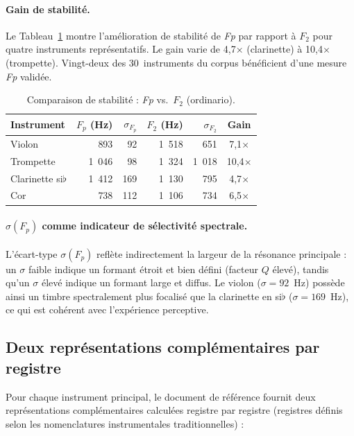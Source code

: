 \documentclass[12pt,a4paper]{article}
\begin{document}
\paragraph{Gain de stabilité.}
Le Tableau~\ref{tab:fp_stability} montre l'amélioration de stabilité de \textit{Fp}
par rapport à $F_2$ pour quatre instruments représentatifs. Le gain varie de
4,7$\times$ (clarinette) à 10,4$\times$ (trompette). Vingt-deux des 30~instruments
du corpus bénéficient d'une mesure \textit{Fp} validée.

\begin{table}[htbp]
\centering
\caption{Comparaison de stabilité : \textit{Fp} vs.\ $F_2$ (ordinario).}
\label{tab:fp_stability}
\begin{tabular}{lrrrrc}
\toprule
Instrument & $F_p$ (Hz) & $\sigma_{F_p}$ & $F_2$ (Hz) & $\sigma_{F_2}$ & Gain \\
\midrule
Violon          & 893   & 92  & 1~518 & 651   & 7,1$\times$ \\
Trompette       & 1~046 & 98  & 1~324 & 1~018 & 10,4$\times$ \\
Clarinette si$\flat$ & 1~412 & 169 & 1~130 & 795 & 4,7$\times$ \\
Cor             & 738   & 112 & 1~106 & 734   & 6,5$\times$ \\
\bottomrule
\end{tabular}
\end{table}

\paragraph{$\sigma(F_p)$ comme indicateur de sélectivité spectrale.}
L'écart-type $\sigma(F_p)$ reflète indirectement la largeur de la résonance principale :
un $\sigma$ faible indique un formant étroit et bien défini (facteur $Q$ élevé), tandis
qu'un $\sigma$ élevé indique un formant large et diffus. Le violon ($\sigma = 92$~Hz)
possède ainsi un timbre spectralement plus focalisé que la clarinette en si$\flat$
($\sigma = 169$~Hz), ce qui est cohérent avec l'expérience perceptive.

\subsection{Deux représentations complémentaires par registre}

Pour chaque instrument principal, le document de référence fournit deux représentations
complémentaires calculées registre par registre (registres définis selon les
nomenclatures instrumentales traditionnelles) :
\end{document}
